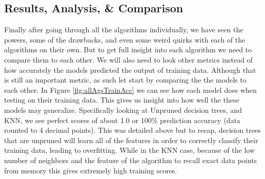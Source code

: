 \documentclass[
	letterpaper, %
]{IEEEtran}
\begin{document}
	\subsection{Results, Analysis, \& Comparison}
	Finally after going through all the algorithms individually, we have seen the powers, some of the drawbacks, and even some weird quirks with each of the algorithms on their own. But to get full insight into each algorithm we need to compare them to each other. We will also need to look other metrics instead of how accurately the models predicted the output of training data. Although that is still an important metric, as such let start by comparing the the models to each other. In Figure \ref{fig:allAgsTrainAcc} we can see how each model does when testing on their training data. This gives us insight into how well the these models may generalize. Specifically looking at Unpruned decision trees, and KNN, we see perfect scores of about 1.0 or 100\% prediction accuracy (data rounted to 4 decimal points). This was detailed above but to recap, decision trees that are unpruned will learn all of the features in order to correctly classify their training data, leading to overfitting. While in the KNN case, because of the low number of neighbors and the feature of the algorithm to recall exact data points from memory this gives extremely high training scores.
	
\end{document}
